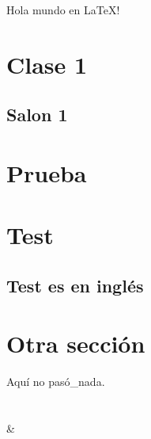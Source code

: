 \documentclass[oneside,12pt]{article} %
\begin{document}
\tableofcontents %

Hola mundo en \LaTeX !
\section{Clase 1}
\subsection{Salon 1}

\section{Prueba}
\section{Test}
	\subsection{Test es en inglés}
	
\section{Otra sección}
	
Aquí no pasó\_nada.\\ \\ \\ \&
\end{document}
